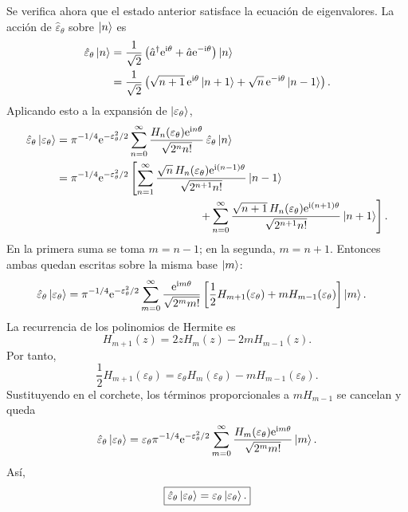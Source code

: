 \documentclass[11pt]{article}
\newcommand{\ii}{\mathrm{i}}
\newcommand{\ee}{\mathrm{e}}
\newcommand{\adag}{\hat a^\dagger}
\begin{document}
Se verifica ahora que el estado anterior satisface la ecuaci\'on de
eigenvalores. La acci\'on de $\hat\varepsilon_\theta$ sobre $\ket n$ es
\begin{align}
  \hat\varepsilon_\theta\ket n
  &=
  \frac{1}{\sqrt2}
  \left(
    \adag\ee^{\ii\theta}
    +
    \hat a\ee^{-\ii\theta}
  \right)\ket n \notag\\
  &=
  \frac{1}{\sqrt2}
  \left(
    \sqrt{n+1}\,\ee^{\ii\theta}\ket{n+1}
    +
    \sqrt n\,\ee^{-\ii\theta}\ket{n-1}
  \right).
\end{align}
Aplicando esto a la expansi\'on de $\ket{\varepsilon_\theta}$,
\begin{align}
  \hat\varepsilon_\theta\ket{\varepsilon_\theta}
  &=
  \pi^{-1/4}\ee^{-\varepsilon_\theta^2/2}
  \sum_{n=0}^{\infty}
  \frac{H_n(\varepsilon_\theta)\ee^{\ii n\theta}}
       {\sqrt{2^n n!}}\,
  \hat\varepsilon_\theta\ket n \notag\\
  &=
  \pi^{-1/4}\ee^{-\varepsilon_\theta^2/2}
  \left[
  \sum_{n=1}^{\infty}
  \frac{\sqrt n\,H_n(\varepsilon_\theta)\ee^{\ii(n-1)\theta}}
       {\sqrt{2^{n+1}n!}}\ket{n-1}
  \right. \notag\\
  &\hspace{4.5cm}\left.
  +
  \sum_{n=0}^{\infty}
  \frac{\sqrt{n+1}\,H_n(\varepsilon_\theta)\ee^{\ii(n+1)\theta}}
       {\sqrt{2^{n+1}n!}}\ket{n+1}
  \right].
\end{align}
En la primera suma se toma $m=n-1$; en la segunda, $m=n+1$. Entonces ambas
quedan escritas sobre la misma base $\ket m$:
\begin{align}
  \hat\varepsilon_\theta\ket{\varepsilon_\theta}
  &=
  \pi^{-1/4}\ee^{-\varepsilon_\theta^2/2}
  \sum_{m=0}^{\infty}
  \frac{\ee^{\ii m\theta}}{\sqrt{2^m m!}}
  \left[
    \frac12 H_{m+1}(\varepsilon_\theta)
    +
    mH_{m-1}(\varepsilon_\theta)
  \right]\ket m.
\end{align}
La recurrencia de los polinomios de Hermite es
\begin{equation}
  H_{m+1}(z)=2zH_m(z)-2mH_{m-1}(z).
\end{equation}
Por tanto,
\begin{equation}
  \frac12 H_{m+1}(\varepsilon_\theta)
  =
  \varepsilon_\theta H_m(\varepsilon_\theta)
  -
  mH_{m-1}(\varepsilon_\theta).
\end{equation}
Sustituyendo en el corchete, los t\'erminos proporcionales a
$mH_{m-1}$ se cancelan y queda
\begin{equation}
  \hat\varepsilon_\theta\ket{\varepsilon_\theta}
  =
  \varepsilon_\theta
  \pi^{-1/4}\ee^{-\varepsilon_\theta^2/2}
  \sum_{m=0}^{\infty}
  \frac{H_m(\varepsilon_\theta)\ee^{\ii m\theta}}
       {\sqrt{2^m m!}}\ket m.
\end{equation}
As\'i,
\begin{equation}
  \boxed{
  \hat\varepsilon_\theta\ket{\varepsilon_\theta}
  =
  \varepsilon_\theta\ket{\varepsilon_\theta}.
  }
\end{equation}
\end{document}
